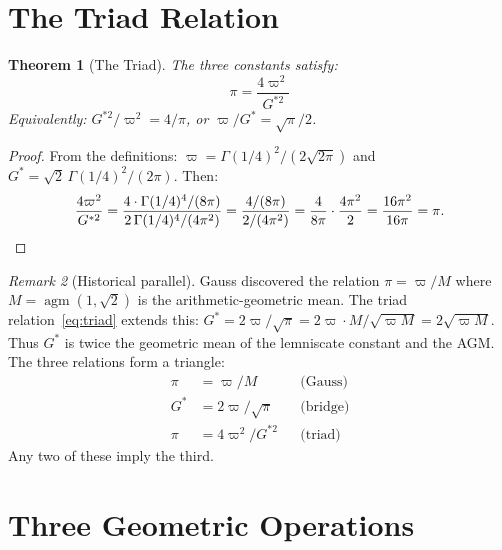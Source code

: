 \documentclass[12pt]{article}
\newtheorem{theorem}{Theorem}[section]
\theoremstyle{definition}
\theoremstyle{remark}
\newtheorem{remark}[theorem]{Remark}
\begin{document}
\section{The Triad Relation}
\label{sec:triad}

\begin{theorem}[The Triad]
\label{thm:triad}
The three constants satisfy:
\begin{equation}
    \boxed{\;\pi = \frac{4\varpi^2}{G^{*2}}\;}
    \label{eq:triad}
\end{equation}
Equivalently: $G^{*2}/\varpi^2 = 4/\pi$, or $\varpi/G^* = \sqrt{\pi}/2$.
\end{theorem}

\begin{proof}
From the definitions: $\varpi = \Gamma(1/4)^2/(2\sqrt{2\pi})$ and $G^* = \sqrt{2}\,\Gamma(1/4)^2/(2\pi)$. Then:
\[
    \frac{4\varpi^2}{G^{*2}} = \frac{4 \cdot \Gamma(1/4)^4/(8\pi)}{2\,\Gamma(1/4)^4/(4\pi^2)} = \frac{4/(8\pi)}{2/(4\pi^2)} = \frac{4}{8\pi}\cdot\frac{4\pi^2}{2} = \frac{16\pi^2}{16\pi} = \pi. \qedhere
\]
\end{proof}

\begin{remark}[Historical parallel]
Gauss discovered the relation $\pi = \varpi/M$ where $M = \operatorname{agm}(1, \sqrt{2})$ is the arithmetic-geometric mean. The triad relation~\eqref{eq:triad} extends this: $G^* = 2\varpi/\sqrt{\pi} = 2\varpi \cdot M/\sqrt{\varpi M} = 2\sqrt{\varpi M}$. Thus $G^*$ is twice the geometric mean of the lemniscate constant and the AGM. The three relations form a triangle:
\begin{align}
    \pi &= \varpi / M && \text{(Gauss)} \\
    G^* &= 2\varpi / \sqrt{\pi} && \text{(bridge)} \\
    \pi &= 4\varpi^2 / G^{*2} && \text{(triad)}
\end{align}
Any two of these imply the third.
\end{remark}

\section{Three Geometric Operations}
\label{sec:roles}
\end{document}
